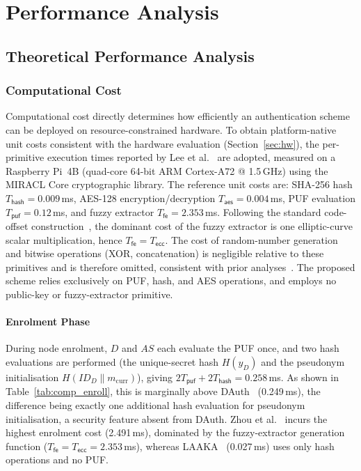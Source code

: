 \chapter{Performance Analysis}

\section{Theoretical Performance Analysis}

\subsection{Computational Cost}

Computational cost directly determines how efficiently an authentication scheme
can be deployed on resource-constrained hardware.
To obtain platform-native unit costs consistent with the hardware evaluation
(Section~\ref{sec:hw}), the per-primitive execution times reported by Lee et
al.~\cite{lee2025plakamd} are adopted, measured on a Raspberry Pi~4B (quad-core
64-bit ARM Cortex-A72 @ 1.5\,GHz) using the MIRACL Core cryptographic library.
The reference unit costs are: SHA-256 hash $T_{\mathsf{hash}} = 0.009$\,ms,
AES-128 encryption/decryption $T_{\mathsf{aes}} = 0.004$\,ms, PUF evaluation
$T_{\mathsf{puf}} = 0.12$\,ms, and fuzzy extractor $T_{\mathsf{fe}} = 2.353$\,ms.
Following the standard code-offset construction~\cite{dodis2004fuzzy}, the dominant
cost of the fuzzy extractor is one elliptic-curve scalar multiplication, hence
$T_{\mathsf{fe}} = T_{\mathsf{ecc}}$.
The cost of random-number generation and bitwise operations (XOR, concatenation)
is negligible relative to these primitives and is therefore omitted, consistent
with prior analyses~\cite{zhou2024auth}.
The proposed scheme relies exclusively on PUF, hash, and AES operations, and
employs no public-key or fuzzy-extractor primitive.

\subsubsection{Enrolment Phase}

During node enrolment, $D$ and $AS$ each evaluate the PUF once, and two hash
evaluations are performed (the unique-secret hash $H(y_D)$ and the pseudonym
initialisation $H(ID_D \| m_{\mathrm{curr}})$), giving
$2T_{\mathsf{puf}} + 2T_{\mathsf{hash}} = \mathbf{0.258}$\,ms.
As shown in Table~\ref{tab:comp_enroll}, this is marginally above
DAuth~\cite{das2026comsnets} (0.249\,ms), the difference being exactly one
additional hash evaluation for pseudonym initialisation, a security feature absent
from DAuth.
Zhou et al.~\cite{zhou2024auth} incurs the highest enrolment cost (2.491\,ms),
dominated by the fuzzy-extractor generation function ($T_{\mathsf{fe}} =
T_{\mathsf{ecc}} = 2.353$\,ms), whereas LAAKA~\cite{ali2024laaka} (0.027\,ms) uses
only hash operations and no PUF.

